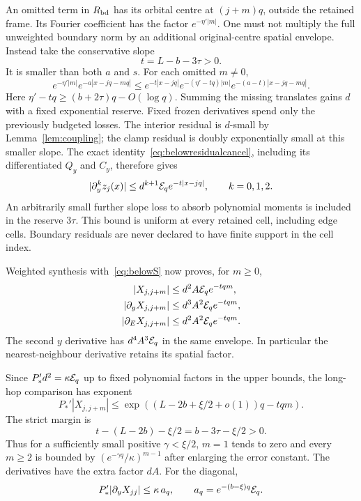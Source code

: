An omitted term in $R_{\rm bd}$ has its orbital centre at $(j+m)q$, outside the retained frame. Its Fourier coefficient has the factor $e^{-\eta'|m|}$. One must not multiply the full unweighted boundary norm by an additional original-centre spatial envelope. Instead take the conservative slope
\begin{equation}\label{eq:belowslope}
 t=L-b-3\tau>0.
\end{equation}
It is smaller than both $a$ and $s$. For each omitted $m\ne0$,
\[
 e^{-\eta'|m|}e^{-a|x-jq-mq|}
 \le e^{-t|x-jq|}
      e^{-(\eta'-tq)|m|}e^{-(a-t)|x-jq-mq|}.
\]
Here $\eta'-tq\ge(b+2\tau)q-O(\log q)$. Summing the missing translates gains $d$ with a fixed exponential reserve. Fixed frozen derivatives spend only the previously budgeted losses. The interior residual is $d$-small by Lemma~\ref{lem:coupling}; the clamp residual is doubly exponentially small at this smaller slope. The exact identity~\eqref{eq:belowresidualcancel}, including its differentiated $Q_y$ and $C_y$, therefore gives
\begin{equation}\label{eq:belowsource}
 |\partial_y^k z_j(x)|\le d^{k+1}\mathcal E_q e^{-t|x-jq|},
 \qquad k=0,1,2.
\end{equation}
An arbitrarily small further slope loss to absorb polynomial moments is included in the reserve $3\tau$. This bound is uniform at every retained cell, including edge cells. Boundary residuals are never declared to have finite support in the cell index.

Weighted synthesis with~\eqref{eq:belowS} now proves, for $m\ge0$,
\begin{align}
 |X_{j,j+m}|&\le d^2A\mathcal E_q e^{-tqm},\label{eq:belowX1}\\
 |\partial_yX_{j,j+m}|&\le d^3A^2\mathcal E_q e^{-tqm},\label{eq:belowX2}\\
 |\partial_EX_{j,j+m}|&\le d^2A^2\mathcal E_q e^{-tqm}.\label{eq:belowXE}
\end{align}
The second $y$ derivative has $d^4A^3\mathcal E_q$ in the same envelope. In particular the nearest-neighbour derivative retains its spatial factor.

Since $P_*'d^2=\kappa\mathcal E_q$ up to fixed polynomial factors in the upper bounds, the long-hop comparison has exponent
\[
 P_*'|X_{j,j+m}|
 \le\exp((L-2b+\xi/2+o(1))q-tqm).
\]
The strict margin is
\begin{equation}\label{eq:belowhopmargin}
 t-(L-2b)-\xi/2=b-3\tau-\xi/2>0.
\end{equation}
Thus for a sufficiently small positive $\gamma<\xi/2$, $m=1$ tends to zero and every $m\ge2$ is bounded by
$(e^{-\gamma q}/\kappa)^{m-1}$ after enlarging the error constant.
The derivatives have the extra factor $dA$. For the diagonal,
\begin{equation}\label{eq:belowdiagonalderivative}
 P_*'|\partial_yX_{jj}|
 \le\kappa\,a_q,\qquad a_q=e^{-(b-\xi)q}\mathcal E_q.
\end{equation}

